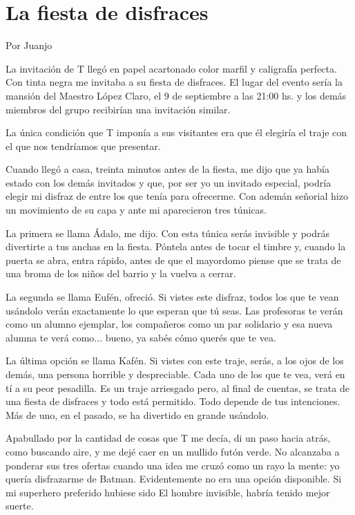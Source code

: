\documentclass[11pt,twoside,openright,a5paper]{book}
\begin{document}
\section*{La fiesta de disfraces}
                                                                                    \begin{flushright}Por Juanjo\end{flushright}

La invitación de T llegó en papel acartonado color marfil y caligrafía perfecta. Con tinta negra me invitaba a su fiesta de disfraces. El lugar del evento sería la mansión del Maestro López Claro, el 9 de septiembre a las 21:00 hs. y los demás miembros del grupo recibirían una invitación similar.

La única condición que T imponía a sus visitantes era que él elegiría el traje con el que nos tendríamos que presentar.

Cuando llegó a casa, treinta minutos antes de la fiesta, me dijo que ya había estado con los demás invitados y que, por ser yo un invitado especial, podría elegir mi disfraz de entre los que tenía para ofrecerme. Con ademán señorial hizo un movimiento de su capa y ante mi aparecieron tres túnicas.

La primera se llama Ádalo, me dijo. Con esta túnica serás invisible y podrás divertirte a tus anchas en la fiesta. Póntela antes de tocar el timbre y, cuando la puerta se abra, entra rápido, antes de que el mayordomo piense que se trata de una broma de los niños del barrio y la vuelva a cerrar.

La segunda se llama Eufén, ofreció. Si vistes este disfraz, todos los que te vean usándolo verán exactamente lo que esperan que tú seas. Las profesoras te verán como un alumno ejemplar, los compañeros como un par solidario y esa nueva alumna te verá como... bueno, ya sabés cómo querés que te vea.

La última opción se llama Kafén. Si vistes con este traje, serás, a los ojos de los demás, una persona horrible y despreciable. Cada uno de los que te vea, verá en tí a su peor pesadilla. Es un traje arriesgado pero, al final de cuentas, se trata de una fiesta de disfraces y todo está permitido. Todo depende de tus intenciones. Más de uno, en el pasado, se ha divertido en grande usándolo.

Apabullado por la cantidad de cosas que T me decía, di un paso hacia atrás, como buscando aire, y me dejé caer en un mullido futón verde. No alcanzaba a ponderar sus tres ofertas cuando una idea me cruzó como un rayo la mente: yo quería disfrazarme de Batman. Evidentemente no era una opción disponible. Si mi superhero preferido hubiese sido El hombre invisible, habría tenido mejor suerte.
\end{document}
